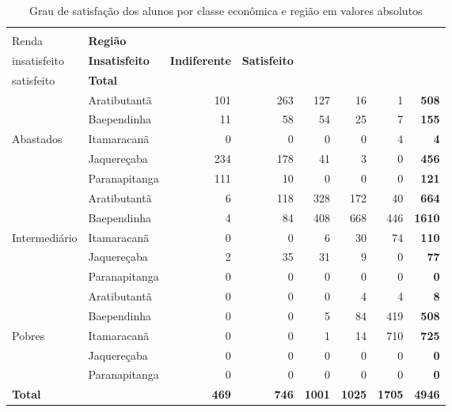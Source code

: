 \begin{table}[h]
\scriptsize
\centering
\caption{Grau de satisfação dos alunos por classe econômica e região em valores absolutos}
\label{tabela:q16}
\vspace{0.5em}
\begin{tabular}{ll rrrrrr}
  \toprule
\textbf{\specialcell{c}{Classe de \\Renda}}    & \textbf{Região}  & \textbf{\specialcell{c}{Muito\\insatisfeito}} & \textbf{Insatisfeito} & \textbf{Indiferente} & \textbf{Satisfeito} & \textbf{\specialcell{c}{Muito\\satisfeito}} & \textbf{Total} \\ 
   \midrule
					& Aratibutantã  & 101 & 263 & 127 &  16 &   1 & \textbf{508}\\%
					& Baependinha   &  11 &  58 &  54 &  25 &   7 & \textbf{155}\\ 
	Abastados		& Itamaracanã   &   0 &   0 &   0 &   0 &   4 & \textbf{4}\\ 
					& Jaquereçaba   & 234 &  178 & 41 &   3 &   0 & \textbf{456}\\ 
					& Paranapitanga & 111 &   10 &  0 &   0 &   0 & \textbf{121}\\ 
\midrule
					& Aratibutantã  &   6 & 118 & 328 & 172 &  40 & \textbf{664}\\ 
					& Baependinha   &   4 &  84 & 408 & 668 & 446 & \textbf{1610}\\ 
	Intermediário 	& Itamaracanã   &   0 &   0 &   6 &  30 &  74 & \textbf{110}\\ 
					& Jaquereçaba   &   2 &  35 &  31 &   9 &   0 & \textbf{77}\\ 
					& Paranapitanga &   0 &   0 &   0 &   0 &   0 & \textbf{0}\\ 
\midrule
					& Aratibutantã  &   0 &   0 &   0 &   4 &   4 & \textbf{8}\\ 
					& Baependinha   &   0 &   0 &   5 &  84 & 419 & \textbf{508}\\ 
	Pobres        	& Itamaracanã   &   0 &   0 &   1 &  14 & 710 & \textbf{725}\\ 
					& Jaquereçaba   &   0 &   0 &   0 &   0 &   0 & \textbf{0}\\ 
					& Paranapitanga &   0 &   0 &   0 &   0 &   0 & \textbf{0}\\ 
\midrule
\textbf{Total}	&  & \textbf{469} & \textbf{746} & \textbf{1001}& \textbf{1025}& \textbf{1705}&\textbf{4946}\\  
\bottomrule
\end{tabular}
\end{table}

